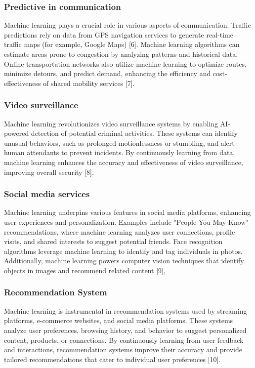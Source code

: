 \subsubsection{Predictive in communication}
Machine learning plays a crucial role in various aspects of communication. Traffic predictions rely on data from GPS navigation services to generate real-time traffic maps (for example, Google Maps) [6]. 
Machine learning algorithms can estimate areas prone to congestion by analyzing patterns and historical data. Online transportation networks also utilize machine learning to optimize routes, minimize detours, and predict demand, enhancing the efficiency and cost-effectiveness of shared mobility services [7].

\subsubsection{Video surveillance}
Machine learning revolutionizes video surveillance systems by enabling AI-powered detection of potential criminal activities. These systems can identify unusual behaviors, such as prolonged motionlessness or stumbling, and alert human attendants to prevent incidents. 
By continuously learning from data, machine learning enhances the accuracy and effectiveness of video surveillance, improving overall security [8].
\subsubsection{Social media services}
Machine learning underpins various features in social media platforms, enhancing user experiences and personalization. Examples include "People You May Know" recommendations, where machine learning analyzes user connections, profile visits, and shared interests to suggest potential friends. 
Face recognition algorithms leverage machine learning to identify and tag individuals in photos. Additionally, machine learning powers computer vision techniques that identify objects in images and recommend related content [9],
\subsubsection{Recommendation System}
Machine learning is instrumental in recommendation systems used by streaming platforms, e-commerce websites, and social media platforms. 
These systems analyze user preferences, browsing history, and behavior to suggest personalized content, products, or connections. By continuously learning from user feedback and interactions, recommendation systems improve their accuracy and provide tailored recommendations that cater to individual user preferences [10].


